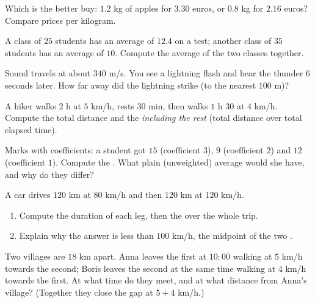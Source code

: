 \begin{exercise}[$\star$]\label{exo:g8:speed:5}
Which is the better buy: $1.2$ kg of apples for $3.30$ euros, or
$0.8$ kg for $2.16$ euros? Compare prices per kilogram.
\end{exercise}

\begin{exercise}[$\star$]\label{exo:g8:speed:6}
A class of $25$ students has an average of $12.4$ on a test; another
class of $35$ students has an average of $10$. Compute the average of
the two classes together.
\end{exercise}

\begin{exercise}[$\star$]\label{exo:g8:speed:7}
Sound travels at about $340$ m/s. You see a lightning flash and hear
the thunder $6$ seconds later. How far away did the lightning strike
(to the nearest $100$ m)?
\end{exercise}

\begin{exercise}[$\star\star$]\label{exo:g8:speed:8}
A hiker walks $2$ h at $5$ km/h, rests $30$ min, then walks $1$ h $30$
at $4$ km/h. Compute the total distance and the 
\emph{including the rest} (total distance over total elapsed time).
\end{exercise}

\begin{exercise}[$\star\star$]\label{exo:g8:speed:9}
Marks with coefficients: a student got $15$ (coefficient $3$), $9$
(coefficient $2$) and $12$ (coefficient $1$). Compute the . What plain (unweighted) average would she have, and why do
they differ?
\end{exercise}

\begin{exercise}[$\star\star$]\label{exo:g8:speed:10}
A car drives $120$ km at $80$ km/h and then $120$ km at $120$ km/h.
\begin{enumerate}
  \item Compute the duration of each leg, then the  over
        the whole trip.
  \item Explain why the answer is less than $100$ km/h, the midpoint
        of the two .
\end{enumerate}
\end{exercise}

\begin{exercise}[$\star\star\star$]\label{exo:g8:speed:11}
Two villages are $18$ km apart. Anna leaves the first at $10{:}00$
walking at $5$ km/h towards the second; Boris leaves the second at
the same time walking at $4$ km/h towards the first. At what time do
they meet, and at what distance from Anna's village? (Together they
close the gap at $5 + 4$ km/h.)
\end{exercise}

